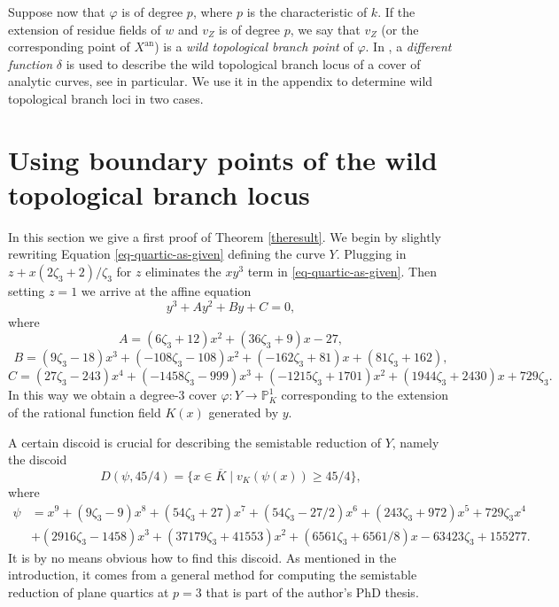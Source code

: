 \documentclass[11pt]{amsart}
\let\ge\geqslant
\renewcommand{\phi}{\varphi}
\newcommand{\BP}{{\mathbb{P}}}
\theoremstyle{definition}
\begin{document}
Suppose now that $\phi$ is of degree $p$, where $p$ is the characteristic of $k$. If the extension of residue fields of $w$ and $v_Z$ is of degree $p$, we say that $v_Z$ (or the corresponding point of $X^\mathrm{an}$) is a \emph{wild topological branch point} of $\phi$. In \cite{ctt}, a \emph{different function} $\delta$ is used to describe the wild topological branch locus of a cover of analytic curves, see \cite[Lemma 4.2.2 and Remark 4.2.3]{ctt} in particular. We use it in the appendix to determine wild topological branch loci in two cases.



\section{Using boundary points of the wild topological branch locus}

In this section we give a first proof of Theorem \ref{theresult}. We begin by slightly rewriting Equation \eqref{eq-quartic-as-given} defining the curve $Y$. Plugging in $z+x(2\zeta_3+2)/\zeta_3$ for $z$ eliminates the $xy^3$ term in \eqref{eq-quartic-as-given}. Then setting $z=1$ we arrive at the affine equation
\begin{equation}
\label{eq-Aversion}
y^3+Ay^2+By+C=0,
\end{equation}
where
\begin{equation*}
A=(6\zeta_3 + 12)x^2+ (36\zeta_3 + 9)x- 27,
\end{equation*}
\begin{equation*}
B=(9\zeta_3 - 18)x^3+ (-108\zeta_3 - 108)x^2+ (-162\zeta_3 + 81)x+ (81\zeta_3 + 162),
\end{equation*}
\begin{equation*}
C=(27\zeta_3 - 243)x^4+ (-1458\zeta_3 - 999)x^3+ (-1215\zeta_3 + 1701)x^2+ (1944\zeta_3 + 2430)x+ 729\zeta_3.
\end{equation*}
In this way we obtain a degree-$3$ cover $\phi\colon Y\to\BP_K^1$ corresponding to the extension of the rational function field $K(x)$ generated by $y$.

A certain discoid is crucial for describing the semistable reduction of $Y$, namely the discoid
\begin{equation}
\label{eq-crucial-discoid}
D(\psi,45/4)=\{x\in\overline{K}\mid v_K(\psi(x))\ge45/4\},
\end{equation}
where
\begin{equation}\label{eq-phi}
\begin{aligned}
\psi&=x^9 + (9\zeta_3 - 9)x^8 + (54\zeta_3 + 27)x^7 + (54\zeta_3 - 27/2)x^6 + (243\zeta_3 + 972)x^5 + 729\zeta_3 x^4\\ &+ (2916\zeta_3 - 1458)x^3 + (37179\zeta_3 + 41553)x^2 + (6561\zeta_3 + 6561/8)x - 63423\zeta_3 + 155277.
\end{aligned}
\end{equation}
It is by no means obvious how to find this discoid. As mentioned in the introduction, it comes from a general method for computing the semistable reduction of plane quartics at $p=3$ that is part of the author's PhD thesis.
\end{document}
